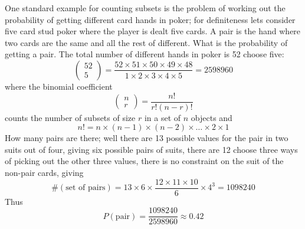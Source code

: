 \documentclass[11pt,a4paper]{scrartcl}
\begin{document}
One standard example for counting subsets is the problem of working
out the probability of getting different card hands in poker; for
definiteness lets consider five card stud poker where the player is
dealt five cards. A pair is the hand where two cards are the same and
all the rest of different. What is the probability of getting a
pair. The total number of different hands in poker is 52 choose five:
\begin{equation}
\left(\begin{array}{c}52\\5\end{array}\right)=\frac{52\times 51\times 50\times 49\times 48}{1\times 2 \times 3 \times 4\times 5}=2598960
\end{equation}
where the binomial coefficient
\begin{equation}
\left(\begin{array}{c}n\\r\end{array}\right)=\frac{n!}{r!(n-r)!}
\end{equation}
counts the number of subsets of size $r$ in a set of $n$ objects and 
\begin{equation}
n!=n\times (n-1)\times (n-2)\times \ldots \times 2 \times 1
\end{equation}
How many pairs are there; well there are 13 possible values for the
pair in two suits out of four, giving six possible pairs of suits,
there are 12 choose three ways of picking out the other three values,
there is no constraint on the suit of the non-pair cards, giving
\begin{equation}
\#(\mbox{set of pairs})=13\times 6\times \frac{12\times 11\times 10}{6}\times 4^3=1098240
\end{equation}
Thus
\begin{equation}
P(\mbox{pair})=\frac{1098240}{2598960}\approx 0.42
\end{equation}
\end{document}
